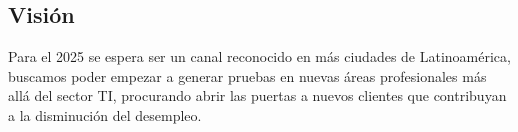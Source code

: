 \subsection{Visión}
Para el 2025 se espera ser un canal reconocido en más ciudades de Latinoamérica, buscamos poder empezar a generar pruebas en nuevas áreas profesionales más allá del sector TI,  procurando abrir las puertas a nuevos clientes que contribuyan a la disminución del desempleo.